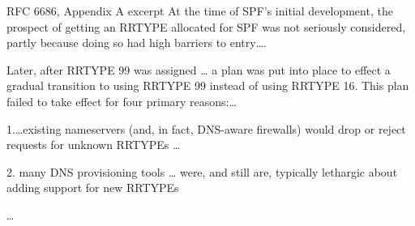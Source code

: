 \begin{frame}{RFC 6686, Appendix A excerpt} 
\fontsize{13}{14}\selectfont
At the time of SPF's initial development, the prospect of getting an
RRTYPE allocated for SPF was not seriously considered, partly because
doing so had high barriers to entry\ldots.

\vspace{.5cm}

Later, after RRTYPE 99 was assigned \ldots
a plan was put into place to effect a gradual
transition to using RRTYPE 99 instead of using RRTYPE 16.
This plan failed to take effect for four primary reasons:\ldots

\vspace{.5cm}

1.\ldots existing nameservers (and, in fact, DNS-aware firewalls) would drop or
reject requests for unknown RRTYPEs \ldots

\vspace{.5cm}

2. many DNS provisioning tools \ldots
   were, and still are, typically lethargic about
   adding support for new RRTYPEs

\vspace{.5cm}

\ldots
\end{frame}
